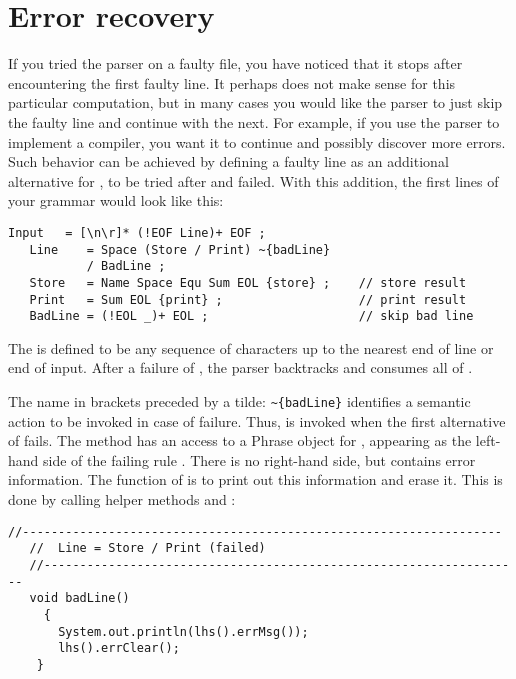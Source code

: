 
\section{Error recovery\label{errRec}}


If you tried the parser on a faulty file, you have noticed that it stops
after encountering the first faulty line.
It perhaps does not make sense for this particular computation,
but in many cases you would like the parser to just skip the faulty line
and continue with the next.
For example, if you use
the parser to implement a compiler, you want it
to continue and possibly discover more errors.
Such behavior can be achieved by defining a faulty line as an additional
alternative for , to be tried after  and  failed.
With this addition, the first lines of your grammar would look like this:

\small
\begin{Verbatim}[frame=single,framesep=2mm,samepage=true,xleftmargin=15mm,xrightmargin=15mm,baselinestretch=0.8]
   Input   = [\n\r]* (!EOF Line)+ EOF ;
   Line    = Space (Store / Print) ~{badLine}
           / BadLine ;
   Store   = Name Space Equ Sum EOL {store} ;    // store result
   Print   = Sum EOL {print} ;                   // print result
   BadLine = (!EOL _)+ EOL ;                     // skip bad line
\end{Verbatim}
\normalsize

The  is defined to  be any sequence of characters
up to the nearest end of line or end of input.
After a failure of , the parser backtracks
and consumes all of .

The name in brackets preceded by a tilde: \verb#~{badLine}# identifies 
a semantic action to be invoked in case of failure.
Thus,  is invoked when
the first alternative of  fails.
The method has an access to a Phrase object for ,
appearing as the left-hand side of the failing rule
.
There is no right-hand side, but  contains
error information.
The function of  is to print out this
information and erase it.
This is done by calling helper methods 
 and :

\small
\begin{Verbatim}[frame=single,framesep=2mm,samepage=true,xleftmargin=15mm,xrightmargin=15mm,baselinestretch=0.8]
   //-------------------------------------------------------------------
   //  Line = Store / Print (failed)
   //-------------------------------------------------------------------
   void badLine()
     {
       System.out.println(lhs().errMsg());
       lhs().errClear();
    }
\end{Verbatim}
\normalsize

